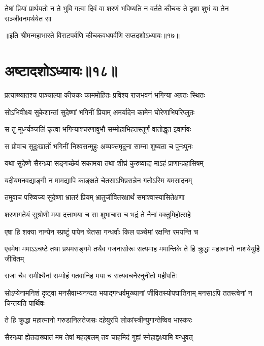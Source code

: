 \twolineshloka
{तेषां प्रियां प्रार्थयतो न ते भुवि गत्वा दिवं वा शरणं भविष्यति}
{न वर्तते कीचक ते दृशा शुभं या तेन सञ्जीवनमर्थयेत सा}

॥इति श्रीमन्महाभारते विराटपर्वणि कीचकवधपर्वणि सप्तदशोऽध्यायः॥१७॥

\chapter{अष्टादशोऽध्यायः॥१८॥}

\twolineshloka
{प्रत्याख्यातश्च पाञ्चाल्या कीचकः काममोहितः}
{प्रविश्य राजभवनं भगिन्या अग्रतः स्थितः}


\twolineshloka
{सोऽभिवीक्ष्य सुकेशान्तां सुदेष्णां भगिनीं प्रियाम्}
{अमर्यादेन कामेन घोरेणाभिपरिप्लुतः}


\twolineshloka
{स तु मूर्ध्न्यञ्जलिं कृत्वा भगिन्याश्चरणावुभौ}
{सम्मोहाभिहतस्तूर्णं वातोद्धृत इवार्णवः}


\twolineshloka
{स प्रोवाच सुदुःखार्तो भगिनीं निश्वसन्मुहुः}
{अव्यक्तमृदुना साम्ना शुष्यता च पुनःपुनः}


\twolineshloka
{यथा सुदेष्णे सैरन्ध्र्या सङ्गच्छेयं सकामया}
{तथा शीघ्रं कुरुष्वाद्य माऽहं प्राणान्प्रहासिषम्}


\twolineshloka
{यदीयमनवद्याङ्गी न मामद्यापि काङ्क्षते}
{चेतसाऽभिप्रसन्नेन गतोऽस्मि यमसादनम्}



\twolineshloka
{तमुवाच परिष्वज्य सुदेष्णा भ्रातरं प्रियम्}
{भ्रातुर्जीवितरक्षार्थं समाश्वास्यासितेक्षणा}


\twolineshloka
{शरणागतेयं सुश्रोणी मया दत्ताभया च सा}
{शुभाचारा च भद्रं ते नैनां वक्तुमिहोत्सहे}


\twolineshloka
{एषा हि शक्या नान्येन स्प्रष्टुं पापेन चेतसा}
{गन्धर्वाः किल पञ्चेमां रक्षन्ति रमयन्ति च}


\threelineshloka
{एवमेषा ममाऽऽचष्टे तथा प्रथमसङ्गमे}
{तथैव गजनासोरूः सत्यमाह ममान्तिके}
{ते हि क्रुद्धा महात्मानो नाशयेयुर्हि जीवितम्}


\twolineshloka
{राजा चैव समीक्ष्यैनां सम्मोहं गतवानिह}
{मया च सत्यवचनैरनुनीतो महीपतिः}


\threelineshloka
{सोऽप्येनामनिशं दृष्ट्वा मनसैवाभ्यनन्दत}
{भयाद्गन्धर्वमुख्यानां जीवितस्योपघातिनाम्}
{मनसाऽपि ततस्त्वेनां न चिन्तयति पार्थिवः}


\twolineshloka
{ते हि क्रुद्धा महात्मानो गरुडानिलतेजसः}
{दहेयुरपि लोकांस्त्रीन्युगान्तेष्विव भास्करः}


\twolineshloka
{सैरन्ध्र्या ह्येतदाख्यातं मम तेषां महद्बलम्}
{तव चाहमिदं गुह्यं स्नेहाद्वक्ष्यामि बन्धुवत्}



